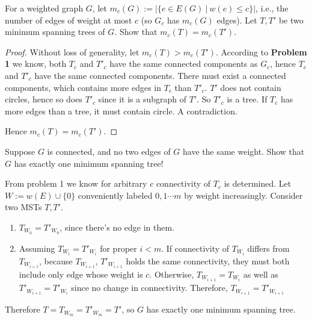 \documentclass[11pt,a4paper,oneside]{article}
\begin{document}
\begin{problem}{2}
	\statement
	For a weighted graph $G$, let $m_c(G) := | \{ e \in E(G) \ | \ w(e) \leq c\}|$, i.e.,
	the number of edges of weight at most $c$ (so $G_c$ has $m_c(G)$ edges).
	Let $T, T'$ be two minimum spanning trees of $G$. Show that
	$m_c(T) = m_c(T')$.

	\solution
	\begin{proof}
	Without loss of generality, let \(m_c(T) > m_c(T')\). According to \textbf{Problem 1} we know, both \(T_c\) and \(T'_c\) have the same connected components as \(G_c\), hence \(T_c\) and \(T'_c\) have the same connected components. There must exist a connected components, which contains more edges in \(T_c\) than \(T'_c\). \(T'\) does not contain circles, hence so does \(T'_c\) since it is a subgraph of \(T'\). So \(T'_c\) is a tree. If \(T_c\) has more edges than a tree, it must contain circle. A contradiction.
	
	Hence \(m_c(T) = m_c(T')\).
	\end{proof}
\end{problem}
\begin{problem}{3}
	\statement
	Suppose $G$ is connected, and no two edges of $G$ have the same weight. 
	Show that $G$ has exactly one minimum spanning tree!
	
	\solution  

	From problem 1 we know for arbitrary $c$ connectivity of $T_c$ is determined.
	Let $W := w(E) \cup \{0\}$ conveniently labeled $0, 1  \cdots m$ by weight increasingly. Consider two MSTs $T, T'$.
	\begin{enumerate}
		\item $T_{W_0} = T'_{W_0}$, since there's no edge in them.
		\item Assuming $T_{W_i} = T'_{W_i}$ for proper $i < m$. If connectivity of $T_{W_i}$ differs from $T_{W_{i + 1}}$, because $T_{W_{i+1}}$, $T'_{W_{i + 1}}$ holds the same connectivity, they must both include only edge whose weight is $c$. Otherwise, $T_{W_{i+1}} = T_{W_{i}}$ as well as $T'_{W_{i+1}} = T'_{W_{i}}$ since no change in connectivity. Therefore, $T_{W_{i + 1}} = T'_{W_{i + 1}}$
	\end{enumerate} 

	Therefore $T = T_{W_m} = T'_{W_m} = T'$, so \(G\) has exactly one minimum spanning tree.
\end{problem}
\end{document}
